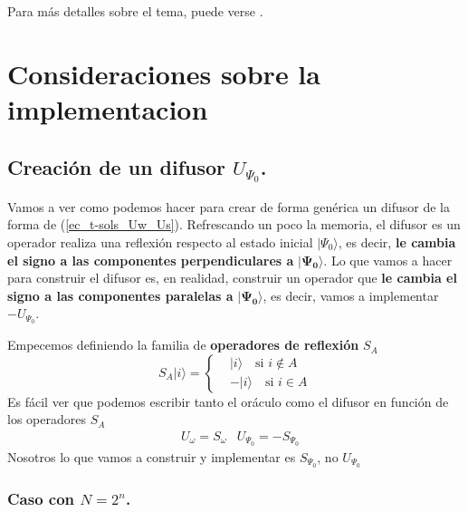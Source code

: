 \documentclass[a4paper,11pt]{article} %
\numberwithin{equation}{section}
\def\lch{\left\{}
\begin{document}
Para más detalles sobre el tema, puede verse \cite{Approximate_QC}.



\newpage
\section{Consideraciones sobre la implementacion} \label{sec_cons_imple}

\subsection{Creación de un difusor $U_{\Psi_0}$.} \label{sub-sec_U_s}

Vamos a ver como podemos hacer para crear de forma genérica un difusor de la forma de (\ref{ec_t-sols_Uw_Us}). Refrescando un poco la memoria, el difusor es un operador realiza una reflexión respecto al estado inicial $| \Psi_0 \rangle$, es decir, \textbf{le cambia el signo a las componentes perpendiculares a} $\bm{| \Psi_0 \rangle}$. Lo que vamos a hacer para construir el difusor es, en realidad, construir un operador que  \textbf{le cambia el signo a las componentes paralelas a} $\bm{| \Psi_0 \rangle}$, es decir, vamos a implementar $-U_{\Psi_0}$. 

Empecemos definiendo la familia de \textbf{operadores de reflexión} $S_A$
\begin{equation} \label{ec_consideraciones_S_a}
\boxed{S_A | i \rangle = 
	\lch
		\begin{matrix}
			& | i \rangle \quad \text{si } i \not \in A \\
			& - | i \rangle \quad \text{si } i \in A
		\end{matrix}
	\right.}
\end{equation}
Es fácil ver que podemos escribir tanto el oráculo como el difusor en función de los operadores $S_A$
\begin{align}
& U_\omega = S_\omega
& \boxed{U_{\Psi_0} = - S_{\Psi_0}}
\end{align}
Nosotros lo que vamos a construir y implementar es $S_{\Psi_0}$, no $U_{\Psi_0}$

\subsubsection{Caso con $N = 2^n$.}
\end{document}
